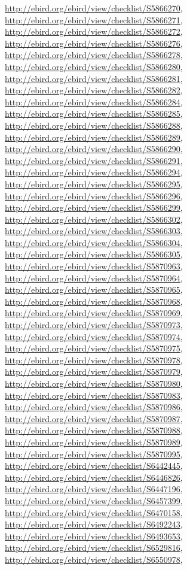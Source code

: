 \documentclass[9pt, article]{memoir}
\begin{document}
\begin{multicols}{2}
\url{http://ebird.org/ebird/view/checklist/S5866270}, 
\url{http://ebird.org/ebird/view/checklist/S5866271}, 
\url{http://ebird.org/ebird/view/checklist/S5866272}, 
\url{http://ebird.org/ebird/view/checklist/S5866276}, 
\url{http://ebird.org/ebird/view/checklist/S5866278}, 
\url{http://ebird.org/ebird/view/checklist/S5866280}, 
\url{http://ebird.org/ebird/view/checklist/S5866281}, 
\url{http://ebird.org/ebird/view/checklist/S5866282}, 
\url{http://ebird.org/ebird/view/checklist/S5866284}, 
\url{http://ebird.org/ebird/view/checklist/S5866285}, 
\url{http://ebird.org/ebird/view/checklist/S5866288}, 
\url{http://ebird.org/ebird/view/checklist/S5866289}, 
\url{http://ebird.org/ebird/view/checklist/S5866290}, 
\url{http://ebird.org/ebird/view/checklist/S5866291}, 
\url{http://ebird.org/ebird/view/checklist/S5866294}, 
\url{http://ebird.org/ebird/view/checklist/S5866295}, 
\url{http://ebird.org/ebird/view/checklist/S5866296}, 
\url{http://ebird.org/ebird/view/checklist/S5866299}, 
\url{http://ebird.org/ebird/view/checklist/S5866302}, 
\url{http://ebird.org/ebird/view/checklist/S5866303}, 
\url{http://ebird.org/ebird/view/checklist/S5866304}, 
\url{http://ebird.org/ebird/view/checklist/S5866305}, 
\url{http://ebird.org/ebird/view/checklist/S5870963}, 
\url{http://ebird.org/ebird/view/checklist/S5870964}, 
\url{http://ebird.org/ebird/view/checklist/S5870965}, 
\url{http://ebird.org/ebird/view/checklist/S5870968}, 
\url{http://ebird.org/ebird/view/checklist/S5870969}, 
\url{http://ebird.org/ebird/view/checklist/S5870973}, 
\url{http://ebird.org/ebird/view/checklist/S5870974}, 
\url{http://ebird.org/ebird/view/checklist/S5870975}, 
\url{http://ebird.org/ebird/view/checklist/S5870978}, 
\url{http://ebird.org/ebird/view/checklist/S5870979}, 
\url{http://ebird.org/ebird/view/checklist/S5870980}, 
\url{http://ebird.org/ebird/view/checklist/S5870983}, 
\url{http://ebird.org/ebird/view/checklist/S5870986}, 
\url{http://ebird.org/ebird/view/checklist/S5870987}, 
\url{http://ebird.org/ebird/view/checklist/S5870988}, 
\url{http://ebird.org/ebird/view/checklist/S5870989}, 
\url{http://ebird.org/ebird/view/checklist/S5870995}, 
\url{http://ebird.org/ebird/view/checklist/S6442445}, 
\url{http://ebird.org/ebird/view/checklist/S6446826}, 
\url{http://ebird.org/ebird/view/checklist/S6447196}, 
\url{http://ebird.org/ebird/view/checklist/S6457399}, 
\url{http://ebird.org/ebird/view/checklist/S6470158}, 
\url{http://ebird.org/ebird/view/checklist/S6492243}, 
\url{http://ebird.org/ebird/view/checklist/S6493653}, 
\url{http://ebird.org/ebird/view/checklist/S6529816}, 
\url{http://ebird.org/ebird/view/checklist/S6550978}, 

\end{multicols}
\end{document}
